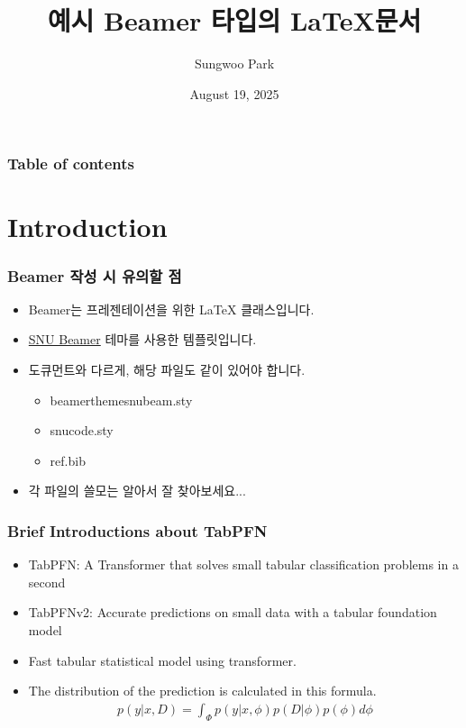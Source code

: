 \documentclass[compress]{beamer}
\begin{document}
\title{예시 Beamer 타입의 \LaTeX 문서}
\author{Sungwoo Park}
\date{August 19, 2025}

{
\begin{frame}[plain]
  \titlepage
\end{frame}
}

\begin{frame}\frametitle{Table of contents}
    \tableofcontents
\end{frame}

\section{Introduction}
\begin{frame}\frametitle{Beamer 작성 시 유의할 점}
	\begin{itemize}
		\item Beamer는 프레젠테이션을 위한 LaTeX 클래스입니다.
		\item \href{https://github.com/snudm/snubeam}{SNU Beamer} 테마를 사용한 템플릿입니다.
		\item 도큐먼트와 다르게, 해당 파일도 같이 있어야 합니다.
		\begin{itemize}
            \item beamerthemesnubeam.sty
            \item snucode.sty
            \item ref.bib
        \end{itemize}
        \item 각 파일의 쓸모는 알아서 잘 찾아보세요...
	\end{itemize}
\end{frame}

\begin{frame}\frametitle{Brief Introductions about TabPFN}
	\begin{itemize}
		\item TabPFN: A Transformer that solves small tabular classification problems in a second \cite{Hollmann2022-op}
		\item \alert{TabPFNv2}: Accurate predictions on small data with a tabular foundation model \cite{Hollmann2025-pr}
		\item Fast tabular statistical model using transformer.
		\item The distribution of the prediction is calculated in this formula.
		\begin{align*}
			p(y | x, D) = \int_{\Phi} p(y|x,\phi)p(D|\phi)p(\phi)d\phi
		\end{align*}
	\end{itemize}
\end{frame}
\end{document}
